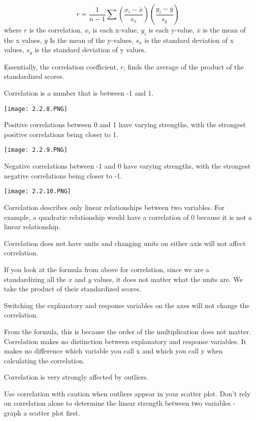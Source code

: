\documentclass[../stats.tex]{subfiles}
\begin{document}
\[ r=\frac{1}{n-1}\sum \left(\frac{x_i-\overline{x}}{s_x}\right) \left(\frac{y_i-\overline{y}}{s_y}\right) \]
where $r$ is the correlation, $x_i$ is each x-value, $y_i$ is each y-value, $\overline{x}$ is the mean of the x values, $\overline{y}$ Is the mean of the y-values, $s_x$ is the standard deviation of x values, $s_y$ is the standard deviation of y values.

Essentially, the correlation coefficient, $r$, finds the average of the product of the standardized scores.

Correlation is a number that is between -1 and 1.
\begin{center}
    \texttt{[image: 2.2.8.PNG]}
\end{center}

Positive correlations between 0 and 1 have varying strengths, with the strongest positive correlations being closer to 1.
\begin{center}
    \texttt{[image: 2.2.9.PNG]}
\end{center}

Negative correlations between -1 and 0 have varying strengths, with the strongest negative correlations being closer to -1.
\begin{center}
    \texttt{[image: 2.2.10.PNG]}
\end{center}

Correlation describes only linear relationships between two variables. For example, a quadratic relationship would have a correlation of 0 because it is not a linear relationship.

Correlation does not have units and changing units on either axis will not affect correlation.

If you look at the formula from above for correlation, since we are a standardizing all the $x$ and $y$ values, it does not matter what the units are. We take the product of their standardized scores.

Switching the explanatory and response variables on the axes will not change the correlation.

From the formula, this is because the order of the multiplication does not matter. Correlation makes no distinction between explanatory and response variables. It makes no difference which variable you call x and which you call y when calculating the correlation.

Correlation is very strongly affected by outliers.

Use correlation with caution when outliers appear in your scatter plot. Don't rely on correlation alone to determine the linear strength between two variables - graph a scatter plot first.
\end{document}
